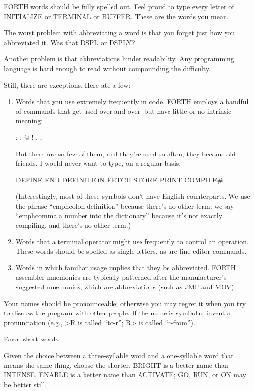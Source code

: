 FORTH words should be fully spelled out.  Feel proud to type every
letter of INITIALIZE or TERMINAL or BUFFER.  These are the words
you mean.

The worst problem with abbreviating a word is that you forget just
how you abbreviated it.  Was that DSPL or DSPLY?

Another problem is that abbreviations hinder readability.  Any programming
language is hard enough to read without compounding the
difficulty.

Still, there are exceptions.  Here ate a few:
\begin{enumerate}
\item Words that you use extremely frequently in code. FORTH employs a handful
of commands that get used over and over, but have little or no intrinsic
meaning:
\begin{Code}
:   ;   @   !   .   ,
\end{Code}
But there are so few of them, and they're used so often, they become old
friends.  I would never want to type, on a regular basis,
\begin{Code}
DEFINE  END-DEFINITION  FETCH  STORE  PRINT  COMPILE#
\end{Code}
(Interestingly, most of these symbols don't have English counterparts.  We
use the phrase ``emph{colon} definition'' because there's no other term; we say
``emph{comma} a number into the dictionary'' because it's not exactly compiling,
and there's no other term.)
\item Words that a terminal operator might use frequently to control an operation.
These words should be spelled as single letters, as are line editor
commands.
\item Words in which familiar usage implies that they be abbreviated.  FORTH
assembler mnemonics are typically patterned after the manufacturer's suggested
mnemonics, which are abbreviations (such as JMP and MOV).
\end{enumerate}
Your names should be pronounceable; otherwise you may regret it when
you try to discuss the program with other people.  If the name is symbolic,
invent a pronunciation (e.g., >R is called ``to-r''; R> is called
``r-from'').

\begin{tip}
Favor short words.
\end{tip}
Given the choice between a three-syllable word and a one-syllable word
that means the same thing, choose the shorter.  BRIGHT is a better name
than INTENSE.  ENABLE is a better name than ACTIVATE; GO,
RUN, or ON may be better still.

